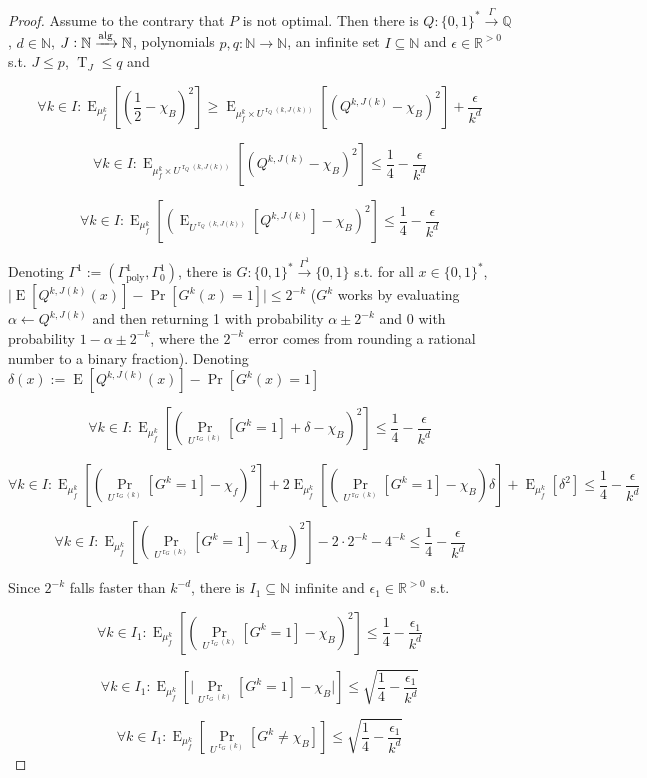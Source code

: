 \documentclass{article}
\numberwithin{equation}{section}
\theoremstyle{definition}
\theoremstyle{plain}
\newcommand{\Words}{{\{ 0, 1 \}^*}}
\newcommand{\Bool}{\{0,1\}}
\DeclareMathOperator{\Prb}{Pr}
\DeclareMathOperator{\E}{E}
\DeclareMathOperator{\T}{T}
\DeclareMathOperator{\R}{r}
\newcommand{\Nats}{\mathbb{N}}
\newcommand{\Rats}{\mathbb{Q}}
\newcommand{\Reals}{\mathbb{R}}
\newcommand{\Abs}[1]{\lvert #1 \rvert}
\newcommand{\Alg}{\xrightarrow{\textnormal{alg}}}
\newcommand{\Scheme}{\xrightarrow{\Gamma}}
\begin{document}
\begin{proof}

Assume to the contrary that $P$ is not optimal. Then there is ${Q: \Words \Scheme \Rats}$, $d \in \Nats$, $J: \Nats \Alg \Nats$, polynomials $p,q: \Nats \rightarrow \Nats$, an infinite set ${I \subseteq \Nats}$ and $\epsilon \in \Reals^{>0}$ s.t. $J \leq p$, $\T_J \leq q$ and

$$ \forall k \in I: \E_{\mu_f^k}[(\frac{1}{2}-\chi_B)^2] \geq \E_{\mu_f^k \times U^{\R_Q(k,J(k))}}[(Q^{k,J(k)}-\chi_B)^2] +\frac{\epsilon}{k^d}$$

$$ \forall k \in I: \E_{\mu_f^k \times U^{\R_Q(k,J(k))}}[(Q^{k,J(k)}-\chi_B)^2] \leq \frac{1}{4} - \frac{\epsilon}{k^d} $$

$$ \forall k \in I: \E_{\mu_f^k}[(\E_{U^{\R_Q(k,J(k))}}[Q^{k,J(k)}]-\chi_B)^2] \leq \frac{1}{4} - \frac{\epsilon}{k^d} $$

Denoting $\Gamma^1:=(\Gamma_{\text{poly}}^1,\Gamma_0^1)$, there is $G: \Words \xrightarrow{\Gamma^1} \Bool$ s.t. for all ${x \in \Words}$, ${\Abs{\E[Q^{k,J(k)}(x)]-\Pr[G^k(x)=1]}\leq 2^{-k}}$ ($G^k$ works by evaluating ${\alpha \leftarrow Q^{k,J(k)}}$ and then returning 1 with probability $\alpha \pm 2^{-k}$ and 0 with probability $1-\alpha \pm 2^{-k}$, where the $2^{-k}$ error comes from rounding a rational number to a binary fraction). Denoting $\delta(x):=\E[Q^{k,J(k)}(x)]-\Pr[G^k(x)=1]$

$$ \forall k \in I: \E_{\mu_f^k}[(\Prb_{U^{\R_G(k)}}[G^k=1]+\delta-\chi_B)^2] \leq \frac{1}{4} - \frac{\epsilon}{k^d} $$

$$ \forall k \in I: \E_{\mu_f^k}[(\Prb_{U^{\R_G(k)}}[G^k=1]-\chi_f)^2]+2 \E_{\mu_f^k}[(\Prb_{U^{\R_G(k)}}[G^k=1]-\chi_B)\delta]+\E_{\mu_f^k}[\delta^2] \leq \frac{1}{4} - \frac{\epsilon}{k^d}$$

$$ \forall k \in I: \E_{\mu_f^k}[(\Prb_{U^{\R_G(k)}}[G^k=1]-\chi_B)^2]-2 \cdot 2^{-k}- 4^{-k} \leq \frac{1}{4} - \frac{\epsilon}{k^d}$$

Since $2^{-k}$ falls faster than $k^{-d}$, there is $I_1 \subseteq \Nats$ infinite and $\epsilon_1 \in \Reals^{>0}$ s.t.

$$ \forall k \in I_1: \E_{\mu_f^k}[(\Prb_{U^{\R_G(k)}}[G^k=1]-\chi_B)^2] \leq \frac{1}{4} - \frac{\epsilon_1}{k^d}$$

$$ \forall k \in I_1: \E_{\mu_f^k}[\Abs{\Prb_{U^{\R_G(k)}}[G^k=1]-\chi_B}] \leq \sqrt{\frac{1}{4} - \frac{\epsilon_1}{k^d}} $$

$$ \forall k \in I_1: \E_{\mu_f^k}[\Prb_{U^{\R_G(k)}}[G^k \ne \chi_B]] \leq \sqrt{\frac{1}{4} - \frac{\epsilon_1}{k^d}} $$


\end{proof}
\end{document}
